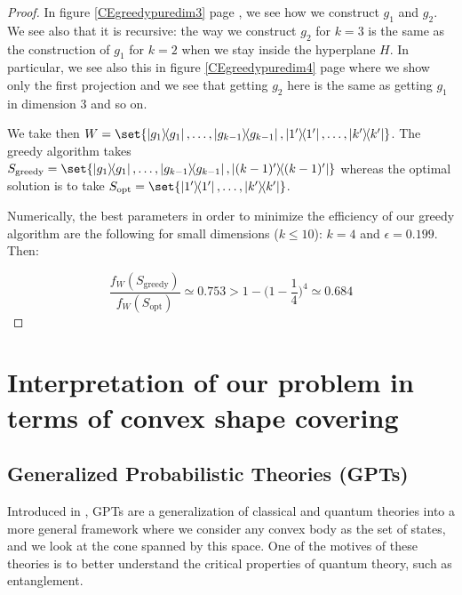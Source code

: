 \documentclass{article}
\theoremstyle{definition}
\theoremstyle{remark}
\begin{document}
\begin{proof}
      In figure \ref{CEgreedypuredim3} page \pageref{CEgreedypuredim3}, we see how we construct $g_1$ and $g_2$. We see also that it is recursive: the way we construct $g_2$ for $k=3$ is the same as the construction of $g_1$ for $k=2$ when we stay inside the hyperplane $H$. In particular, we see also this in figure \ref{CEgreedypuredim4} page \pageref{CEgreedypuredim4} where we show only the first projection and we see that getting $g_2$ here is the same as getting $g_1$ in dimension $3$ and so on.
      
      We take then $W = \set{\dyad{g_1}, \ldots, \dyad{g_{k-1}}, \dyad{1'}, \ldots, \dyad{k'}}$. The greedy algorithm takes $S_{\text{greedy}} = \set{\dyad{g_1}, \ldots, \dyad{g_{k-1}}, \dyad{(k-1)'}}$ whereas the optimal solution is to take $S_{\text{opt}} = \set{\dyad{1'}, \ldots, \dyad{k'}}$.

      Numerically, the best parameters in order to minimize the efficiency of our greedy algorithm are the following for small dimensions ($k \leq 10$): $k=4$ and $\epsilon=0.199$. Then:

      \[\frac{f_W(S_{\text{greedy}})}{f_W(S_{\text{opt}})} \simeq 0.753 > 1-\Big(1-\frac{1}{4}\Big)^4 \simeq 0.684\]
\end{proof}

\newpage

\section{Interpretation of our problem in terms of convex shape covering}
\subsection{Generalized Probabilistic Theories (GPTs)}
Introduced in \cite{Barrett07}, GPTs are a generalization of classical and quantum theories into a more general framework where we consider any convex body as the set of states, and we look at the cone spanned by this space. One of the motives of these theories is to better understand the critical properties of quantum theory, such as entanglement.
\end{document}
